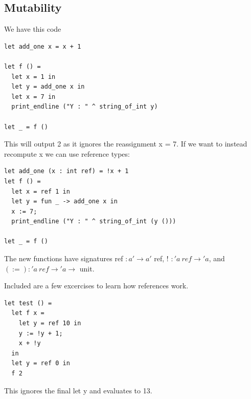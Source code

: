 \subsection{Mutability}
We have this code
\begin{lstlisting}
let add_one x = x + 1

let f () =
  let x = 1 in
  let y = add_one x in
  let x = 7 in
  print_endline ("Y : " ^ string_of_int y)

let _ = f ()

\end{lstlisting}
This will output 2 as it ignores the reassignment x = 7. If we want to instead recompute x we can use reference types:
\begin{lstlisting}
let add_one (x : int ref) = !x + 1
let f () =
  let x = ref 1 in
  let y = fun _ -> add_one x in
  x := 7;
  print_endline ("Y : " ^ string_of_int (y ()))

let _ = f ()
\end{lstlisting}
The new functions have signatures ref $: a' \to a'$ ref, ! $: 'a \: ref \to 'a$, and $(:=) : 'a \: ref \to 'a \to $ unit.

Included are a few excercises to learn how references work.
\begin{lstlisting}
let test () =
  let f x =
    let y = ref 10 in
    y := !y + 1;
    x + !y
  in
  let y = ref 0 in
  f 2
\end{lstlisting}
This ignores the final let y and evaluates to 13. 